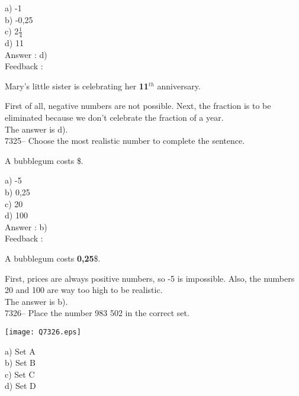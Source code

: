 \documentclass[letterpaper, 12pt]{article}
\begin{document}
a) -1\\
b) -0,25\\
c) 2$\frac{1}{4}$\\
d) 11\\

Answer : d)\\

Feedback :\\
\begin{center}
Mary's little sister is celebrating her \textbf{11$^{th}$} anniversary.\\
\end{center}

First of all, negative numbers are not possible. Next, the fraction is to be eliminated because we don't celebrate
the fraction of a year.\\
The answer is d).\\


7325-- Choose the most realistic number to complete the sentence.\\
\begin{center}
A bubblegum costs \underline{\quad\quad}\$.\\
\end{center}

a) -5\\
b) 0,25\\
c) 20\\
d) 100\\

Answer : b)\\

Feedback :\\
\begin{center}
A bubblegum costs \textbf{0,25}\$.\\
\end{center}

First, prices are always positive numbers, so -5 is impossible. Also, the numbers 20 and 100 are way too high to be realistic.\\
The answer is b).\\


7326-- Place the number 983 502 in the correct set.

\begin{center}
    \texttt{[image: Q7326.eps]}
    \end{center}


a) Set A\\
b) Set B\\
c) Set C\\
d) Set D\\
\end{document}
